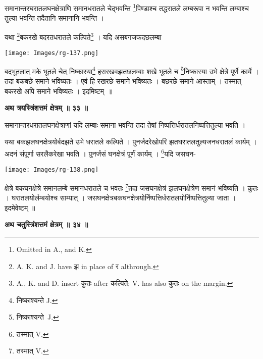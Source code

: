 \documentclass[11pt, openany]{book}
\begin{document}
{\ab समानान्तरघरातलघनक्षेत्राणि समानधरातले चेद्भवन्ति
\renewcommand{\thefootnote}{१}\footnote{\en Omitted in A., and K.}पिण्डाश्च तद्धरातले लम्बरूपा न भवन्ति लम्बाश्च तुल्या भवन्ति तदैतानि समानानि भवन्ति ।}\\
\vspace{3mm}

यथा \renewcommand{\thefootnote}{२}\footnote{{\en A. K. and J. have} झ {\en in place of} र {\en althrough.}}बकरखे बदरतधरातले कल्पिते\renewcommand{\thefootnote}{३}\footnote{{\en A., K. and D. insert} कुतः {\en after}
कल्पिते; {\en V. has also} कुतः {\en on the margin.} } । यदि असबगजफदछलम्बा 
\begin{center}
\texttt{[image: Images/rg-137.png]}  
\end{center}
बदभूतलात् मके भूतले चेत् निष्कास्या\renewcommand{\thefootnote}{४}\footnote{निष्काश्यन्ते {\en J.}} हसरखवझतछलम्बाः शखे भूतले च \renewcommand{\thefootnote}{४}\footnote{निष्काश्यन्ते~{\en J.}}निष्कास्या उभे क्षेत्रे पूर्णे कार्ये । तदा बकबछे समाने भविष्यतः । एवं हि रखरछे समाने भविष्यतः । बछरछे समाने आस्ताम् । तस्मात् बकरखे अपि समाने भविष्यतः । इदमिष्टम्~॥\\
\begin{center}
\textbf{\large अथ त्रयस्त्रिंशत्तमं क्षेत्रम् ॥ ३३ ॥}
\end{center}
\vspace{5mm}

 {\ab समानान्तरधरातलघनक्षेत्राणां यदि लम्बाः समाना भवन्ति तदा तेषां निष्पत्तिर्धरातलनिष्पत्तितुल्या भवति ।}\\
\vspace{3mm}

 यथा बकझलघनक्षेत्रयोर्बदझते उभे धरातले कल्पिते । पुनर्जदरेखोपरि झतघरातलतुल्यजनधरातलं कार्यम् । अदनं संपूर्णा सरलैकरेखा भवति । पुनर्जसं घनक्षेत्रं पूर्णं कार्यम् । \renewcommand{\thefootnote}{५}\footnote{तस्मात् {\en V.}}यदि जसघन-

\newpage
\begin{center}
\texttt{[image: Images/rg-138.png]}  
\end{center}
क्षेत्रे बकघनक्षेत्रे समानलम्बे समानधरातले च भवतः \renewcommand{\thefootnote}{१}\footnote{तस्मात् {\en V.}}तदा
जसघनक्षेत्रं झलघनक्षेत्रेण समानं भविष्यति । कुतः । घरातलयोर्लम्बयोश्च
साम्यात् । जसघनक्षेत्रबकघनक्षेत्रयोर्निष्पत्तिर्धरातलयोर्निष्पत्तितुल्या जाता । इदमेवेष्टम् ॥\\
\begin{center}
\textbf{\large अथ चतुस्त्रिंशत्तमं क्षेत्रम् ॥ ३४ ॥}
\end{center}
\vspace{5mm}
\end{document}
